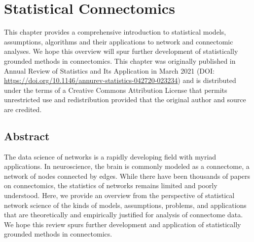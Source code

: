 \chapter{Statistical Connectomics} \label{chap:statistical}

This chapter provides a comprehensive introduction to statistical models, assumptions, algorithms and their applications to network and connectomic analyses. We hope this overview will spur further development of statistically grounded methods in connectomics. This chapter was originally published in Annual Review of Statistics and Its Application in March 2021 (DOI: \url{https://doi.org/10.1146/annurev-statistics-042720-023234}) and is distributed under the terms of a Creative Commons Attribution License that permits unrestricted use and redistribution provided that the original author and source are credited.

\begin{singlespace}         %
\end{singlespace} 

\pagebreak
\section*{Abstract}
The data science of networks is a rapidly developing field with myriad applications.  In neuroscience, the brain is commonly modeled as a connectome, a network of nodes connected by edges. While there have been thousands of papers on connectomics, the statistics of networks remains limited and poorly understood.  Here, we provide an overview from the perspective of statistical network science of the kinds of models, assumptions, problems, and applications that are theoretically and empirically justified for analysis of connectome data.  We hope this review spurs further development and application of statistically grounded methods in connectomics.
\pagebreak











